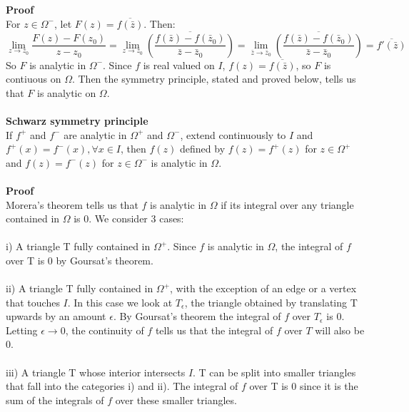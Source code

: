 \documentclass[12 pt]{article}
\begin{document}
\\
\\
\textbf{Proof}
\\
For $z\in \Omega^{-}$, let $F(z) = \overline{ f(\bar z)}$. Then:
\[ \lim_{z\to z_0} \frac{F(z)-F(z_0)}{z-z_0} = \lim_{z\to z_0} \overline{\left( \frac{f(\bar z) - f(\bar z_0)}{\bar z - \bar z_0}\right) } = \lim_{\bar z \to \bar z_0} \overline{\left( \frac{f(\bar z) - f(\bar z_0)}{\bar z - \bar z_0}\right) } = \overline{f'(\bar z)} \]
So $F$ is analytic in $\Omega^{-}$. Since $f$ is real valued on $I$, $f(z) = \overline{f(\bar z)}$, so $F$ is contiuous on $\Omega$. Then the symmetry principle, stated and proved below, tells us that $F$ is analytic on $\Omega$.
\\
\\
\textbf{Schwarz symmetry principle}
\\
If $f^{+}$ and $f^{-}$ are analytic in $\Omega^{+}$ and $\Omega^{-}$, extend continuously to $I$ and $f^{+}(x) = f^{-}(x) , \forall x\in I$, then $f(z)$ defined by $f(z)=f^{+} (z)$ for $z\in \Omega^{+}$ and $f(z)=f^{-} (z)$ for $z\in \Omega^{-}$ is analytic in $\Omega$.
\\
\\
\textbf{Proof}
\\
Morera's theorem tells us that $f$ is analytic in $\Omega$ if its integral over any triangle contained in $\Omega$ is 0. We consider 3 cases:
\\
\\
i) A triangle T fully contained in $\Omega^{+}$. Since $f$ is analytic in $\Omega$, the integral of $f$ over T is 0 by Goursat's theorem.
\\
\\
ii) A triangle T fully contained in $\Omega^{+}$, with the exception of an edge or a vertex that touches $I$. In this case we look at $T_{\epsilon}$, the triangle obtained by translating T upwards by an amount $\epsilon$. By Goursat's theorem the integral of $f$ over $T_{\epsilon}$ is 0. Letting $\epsilon \to 0$, the continuity of $f$ tells us that the integral of $f$ over $T$ will also be 0.
\\
\\
iii) A triangle T whose interior intersects $I$. T can be split into smaller triangles that fall into the categories i) and ii). The integral of $f$ over T is 0 since it is the sum of the integrals of $f$ over these smaller triangles.
\\
\\
\end{document}
